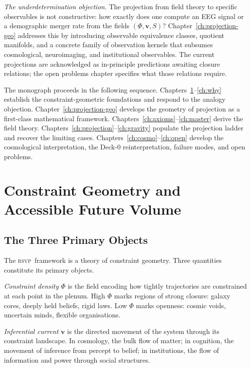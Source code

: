 \documentclass[12pt, oneside]{book}
\theoremstyle{plain}
\theoremstyle{definition}
\newcommand{\vfield}{\mathbf{v}}
\newcommand{\RSVP}{\textsc{rsvp}}
\begin{document}
\textit{The underdetermination objection.} The projection from field theory to
specific observables is not constructive: how exactly does one compute an EEG signal
or a demographic merger rate from the fields $(\Phi, \vfield, S)$? Chapter~\ref{ch:projection-geo}
addresses this by introducing observable equivalence classes, quotient manifolds,
and a concrete family of observation kernels that subsumes cosmological, neuroimaging,
and institutional observables. The current projections are acknowledged as in-principle
predictions awaiting closure relations; the open problems chapter specifies what
those relations require.

The monograph proceeds in the following sequence. Chapters~\ref{ch:geometry}--\ref{ch:why}
establish the constraint-geometric foundations and respond to the analogy objection.
Chapter~\ref{ch:projection-geo} develops the geometry of projection as a first-class
mathematical framework. Chapters~\ref{ch:axioms}--\ref{ch:master} derive the field
theory. Chapters~\ref{ch:projection}--\ref{ch:gravity} populate the projection ladder
and recover the limiting cases. Chapters~\ref{ch:cosmo}--\ref{ch:open} develop the
cosmological interpretation, the Deck-0 reinterpretation, failure modes, and open
problems.

\chapter{Constraint Geometry and Accessible Future Volume}
\label{ch:geometry}

\section{The Three Primary Objects}
\label{sec:primary}

The \RSVP\ framework is a theory of constraint geometry. Three quantities constitute
its primary objects.

\textit{Constraint density} $\Phi$ is the field encoding how tightly trajectories
are constrained at each point in the plenum. High $\Phi$ marks regions of strong
closure: galaxy cores, deeply held beliefs, rigid laws. Low $\Phi$ marks openness:
cosmic voids, uncertain minds, flexible organisations.

\textit{Inferential current} $\vfield$ is the directed movement of the system
through its constraint landscape. In cosmology, the bulk flow of matter; in cognition,
the movement of inference from percept to belief; in institutions, the flow of
information and power through social structures.
\end{document}
